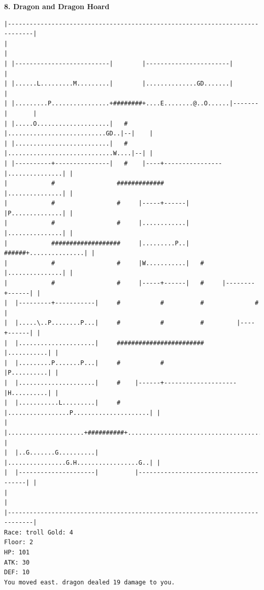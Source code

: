\documentclass[11pt]{article}
\theoremstyle{plain}
\begin{document}
\newpage
\textbf{8. Dragon and Dragon Hoard}

\begin{Verbatim}[fontsize=\scriptsize]
|-----------------------------------------------------------------------------|
|                                                                             |
| |--------------------------|        |-----------------------|               |
| |......L.........M.........|        |..............GD.......|               |
| |.........P................+########+....E........@..O......|-------|       |
| |.....O....................|   #    |...........................GD..|--|    |
| |..........................|   #    |.............................W....|--| |
| |----------+---------------|   #    |----+----------------|...............| |
|            #                 #############                |...............| |
|            #                 #     |-----+------|         |P..............| |
|            #                 #     |............|         |...............| |
|            ###################     |.........P..|   ######+...............| |
|            #                 #     |W...........|   #     |...............| |
|            #                 #     |-----+------|   #     |--------+------| |
|  |---------+-----------|     #           #          #              #        |
|  |.....\..P........P...|     #           #          #         |----+------| |
|  |.....................|     ########################         |...........| |
|  |.........P.......P...|     #           #                    |P..........| |
|  |.....................|     #    |------+--------------------|H..........| |
|  |...........L.........|     #    |.................P.....................| |
|  |.....................+##########+.......................................| |
|  |..G.......G..........|          |................G.H.................G..| |
|  |---------------------|          |---------------------------------------| |
|                                                                             |
|-----------------------------------------------------------------------------|
Race: troll Gold: 4                                                    Floor: 2
HP: 101
ATK: 30
DEF: 10
You moved east. dragon dealed 19 damage to you. 
\end{Verbatim}
\end{document}
